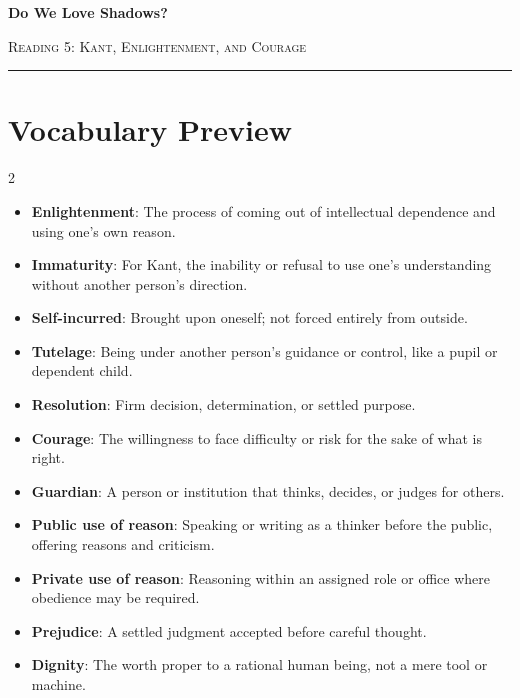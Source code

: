 \documentclass[12pt]{article}
\begin{document}
\begin{center}
{\LARGE\bfseries Do We Love Shadows?}\par\vspace{0.25em}
{\large\scshape Reading 5: Kant, Enlightenment, and Courage}\par\vspace{0.45em}
\rule{0.82\textwidth}{0.4pt}\par\vspace{0.7em}
\end{center}

\section*{Vocabulary Preview}
\begin{multicols}{2}
\begin{itemize}[leftmargin=*, itemsep=0.18em]
\item \textbf{Enlightenment}: The process of coming out of intellectual dependence and using one's own reason.
\item \textbf{Immaturity}: For Kant, the inability or refusal to use one's understanding without another person's direction.
\item \textbf{Self-incurred}: Brought upon oneself; not forced entirely from outside.
\item \textbf{Tutelage}: Being under another person's guidance or control, like a pupil or dependent child.
\item \textbf{Resolution}: Firm decision, determination, or settled purpose.
\item \textbf{Courage}: The willingness to face difficulty or risk for the sake of what is right.
\item \textbf{Guardian}: A person or institution that thinks, decides, or judges for others.
\item \textbf{Public use of reason}: Speaking or writing as a thinker before the public, offering reasons and criticism.
\item \textbf{Private use of reason}: Reasoning within an assigned role or office where obedience may be required.
\item \textbf{Prejudice}: A settled judgment accepted before careful thought.
\item \textbf{Dignity}: The worth proper to a rational human being, not a mere tool or machine.
\end{itemize}
\end{multicols}
\end{document}
